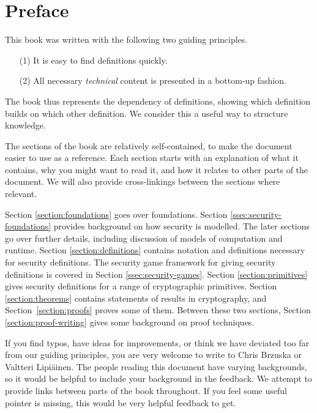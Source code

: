 \section*{Preface}
This book was written with the following two guiding principles.
\begin{itemize}
    \item[(1)] It is easy to find definitions quickly.
    \item[(2)] All necessary \emph{technical} content is presented in a bottom-up fashion.
\end{itemize}
The book thus represents the dependency of definitions, showing which definition builds on which other definition. We consider this a useful way to structure knowledge.

The sections of the book are relatively self-contained, to make the document easier to use as a reference. Each section starts with an explanation of what it contains, why you might want to read it, and how it relates to other parts of the document. We will also provide cross-linkings between the sections where relevant.

Section \ref{section:foundations} goes over foundations. Section \ref{ssec:security-foundations} provides background on how security is modelled. The later sections go over further details, including discussion of models of computation and runtime. Section \ref{section:definitions} contains notation and definitions necessary for security definitions. The security game framework for giving security definitions is covered in Section \ref{ssec:security-games}. Section \ref{section:primitives} gives security definitions for a range of cryptographic primitives. Section \ref{section:theorems} contains statements of results in cryptography, and Section~\ref{section:proofs} proves some of them. Between these two sections, Section \ref{section:proof-writing} gives some background on proof techniques.

If you find typos, have ideas for improvements, or think we have deviated too far from our guiding principles, you are very welcome to write to Chris Brzuska or Valtteri Lipi{\"a}inen. The people reading this document have varying backgrounds, so it would be helpful to include your background in the feedback. We attempt to provide links between parts of the book throughout. If you feel some useful pointer is missing, this would be very helpful feedback to get.